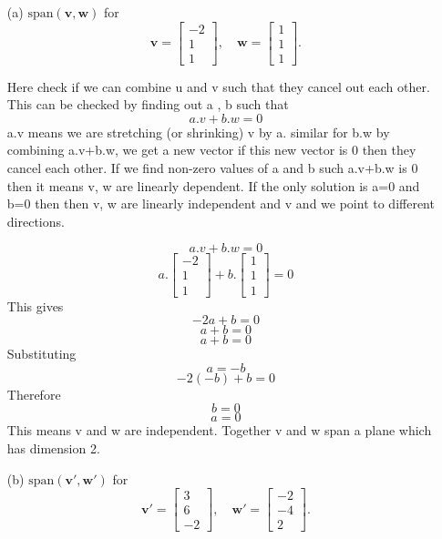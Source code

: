 \begin{enumerate}
    \item[(a)] $\text{span}(\mathbf{v}, \mathbf{w})$ for 
    \[
    \mathbf{v} =
    \begin{bmatrix}
    -2 \\ 1 \\ 1
    \end{bmatrix},
    \quad
    \mathbf{w} =
    \begin{bmatrix}
    1 \\ 1 \\ 1
    \end{bmatrix}.
    \]

    Here check if we can combine u and v such that they cancel out each other.
    This can be checked by finding out a , b such that 
    \[
    a.v + b.w = 0
    \]
    a.v  means we are stretching (or shrinking) v by a. 
    similar for b.w
    by combining a.v+b.w, we get a new vector if this new vector is 0 then they cancel each other.
    If we find non-zero values of a and b such a.v+b.w  is 0 then it means v, w are linearly dependent.  If the only solution is a=0 and b=0 then then v, w are linearly independent and v and we point to different directions.

    \[
     a.v + b.w = 0
    \]
    \[
     a.\begin{bmatrix}
    -2 \\ 1 \\ 1
    \end{bmatrix} + b.\begin{bmatrix}
    1 \\ 1 \\ 1
    \end{bmatrix}
     = 0
    \]
    This gives
    \[
    -2a +b =0
    \]
    \[
    a +b =0
    \]
    \[
    a +b =0
    \]
    Substituting 
    \[
    a=-b
    \]
    \[
    -2(-b)+b=0
    \]
    Therefore
    \[
    b=0
    \]
    \[
    a=0
    \]
    This means v and w are independent.  Together v and w span a plane which has dimension 2.

    
    
    \item[(b)] $\text{span}(\mathbf{v'}, \mathbf{w'})$ for 
    \[
    \mathbf{v'} =
    \begin{bmatrix}
    3 \\ 6 \\ -2
    \end{bmatrix},
    \quad
    \mathbf{w'} =
    \begin{bmatrix}
    -2 \\ -4 \\ 2
    \end{bmatrix}.
    \]


\end{enumerate}
